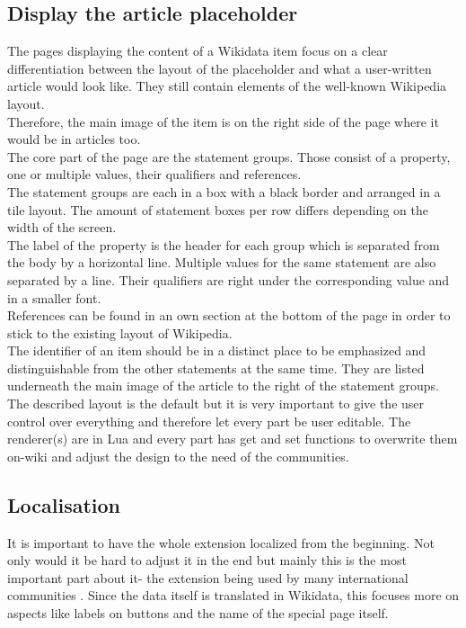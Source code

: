 \documentclass[11pt]{article}
\begin{document}
\subsection{Display the article placeholder}
The pages displaying the content of a Wikidata item focus on a clear differentiation between the layout of the placeholder and what a user-written article would look like. They still contain elements of the well-known Wikipedia layout. \\
Therefore, the main image of the item is on the right side of the page where it would be in articles too.\\
The core part of the page are the statement groups. Those consist of a property, one or multiple values, their qualifiers and references. \\
The statement groups are each in a box with a black border and arranged in a tile layout. The amount of statement boxes per row differs depending on the width of the screen.\\
The label of the property is the header for each group which is separated from the body by a horizontal line. Multiple values for the same statement are also separated by a line. Their qualifiers are right under the corresponding value and in a smaller font. \\
References can be found in an own section at the bottom of the page in order to stick to the existing layout of Wikipedia. \\
The identifier of an item should be in a distinct place to be emphasized and distinguishable from the other statements at the same time. They are listed underneath the main image of the article to the right of the statement groups. \\
The described layout is the default but it is very important to give the user control over everything and therefore let every part be user editable. The renderer(s) are in Lua and every part has get and set functions to overwrite them on-wiki and adjust the design to the need of the communities. \\

\subsection{Localisation}
It is important to have the whole extension localized from the beginning. Not only would it be hard to adjust it in the end but mainly this is the most important part about it- the extension being used by many international communities%
. Since the data itself is translated in Wikidata, this focuses more on aspects like labels on buttons and the name of the special page itself. \\
\end{document}
